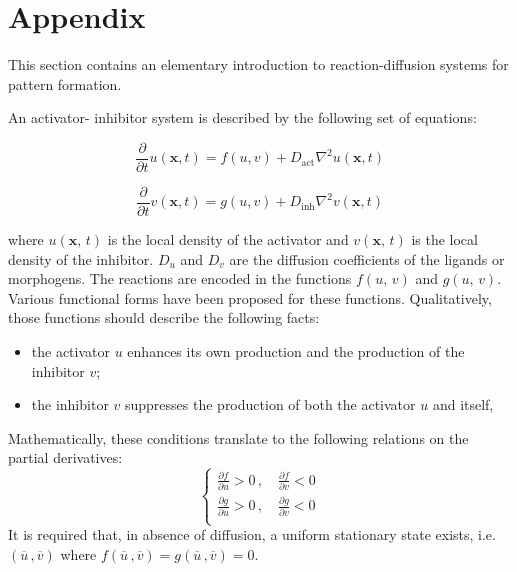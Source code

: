\chapter{Appendix}

This section contains an elementary introduction to reaction-diffusion systems for pattern formation. 

An activator- inhibitor system is described by the following set of equations:

\begin{equation}
\frac{\partial}{\partial t} u(\mathbf{x}, t) = f(u, v) + D_{\text{act}} \nabla^2 u(\mathbf{x}, t)
\end{equation}

\begin{equation}
\frac{\partial}{\partial t} v(\mathbf{x}, t) = g(u, v) + D_{\text{inh}} \nabla^2 v(\mathbf{x}, t)
\end{equation}

where $u(\mathbf{x},\, t)$ is the local density of the activator and $v(\mathbf{x},\, t)$ is the local density of the inhibitor. $D_u$  and $D_v$ are the diffusion coefficients of the ligands or morphogens. The reactions are encoded in the functions $f(u,\,v)$ and $g(u,\,v)$. Various functional forms have been proposed for these functions. Qualitatively, those functions should describe the following facts:
\begin{itemize}
    \item the activator $u$ enhances its own production and the production of the inhibitor $v$;
    \item the inhibitor $v$ suppresses the production of both the activator $u$ and itself,
\end{itemize}
Mathematically, these conditions translate to the following relations on the partial derivatives:
\begin{equation*}
    \begin{cases}
        \frac{\partial f}{\partial u} > 0 \,,\quad \frac{\partial f}{\partial v} < 0 \\
         \frac{\partial g}{\partial u} > 0 \,,\quad \frac{\partial g}{\partial v} < 0 \\       
    \end{cases}
\end{equation*}
It is required that, in absence of diffusion, a uniform stationary state exists, i.e.
$(\overline{u}\,, \overline{v})$
where $f(\overline{u}\,, \overline{v}) = g(\overline{u}\,, \overline{v})=0$. 

